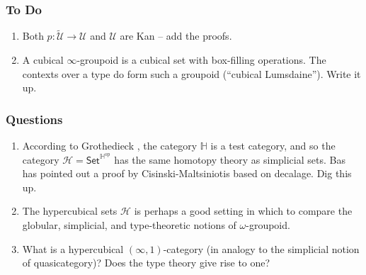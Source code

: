 \documentclass[11pt]{article}
\newcommand{\psh}[1]{\ensuremath{\mathsf{Set}^{#1^{\mathrm{op}}}}}
\renewcommand{\H}{\ensuremath{\mathbb{H}}}
\newcommand{\HH}{\ensuremath{\mathcal{H}}}
\newcommand{\U}{\ensuremath{\mathcal{U}}}
\newcommand{\UU}{\ensuremath{\widetilde{\mathcal{U}}}}
\theoremstyle{remark}
\theoremstyle{definition}
\begin{document}
\subsubsection*{To Do}
\begin{enumerate}

\item Both $p : \UU \to \U$  and $\U$ are Kan -- add the proofs.
\item A cubical $\infty$-groupoid is a cubical set with box-filling operations.  The contexts over a type do form such a groupoid (``cubical Lumsdaine''). Write it up.

\end{enumerate}

\subsubsection*{Questions}
\begin{enumerate}

\item According to Grothedieck \cite{PS}, the category $\H$ is a test category, and so the category $\HH = \psh{\H}$ has the same homotopy theory as simplicial sets.  Bas has pointed out a proof by Cisinski-Maltsiniotis based on decalage.  Dig this up.

\item The hypercubical sets $\HH$ is perhaps a good setting in which to compare the globular, simplicial, and type-theoretic notions of $\omega$-groupoid.

\item What is a hypercubical $(\infty, 1)$-category (in analogy to the simplicial notion of quasicategory)?  Does the type theory give rise to one?

\end{enumerate}
\end{document}
